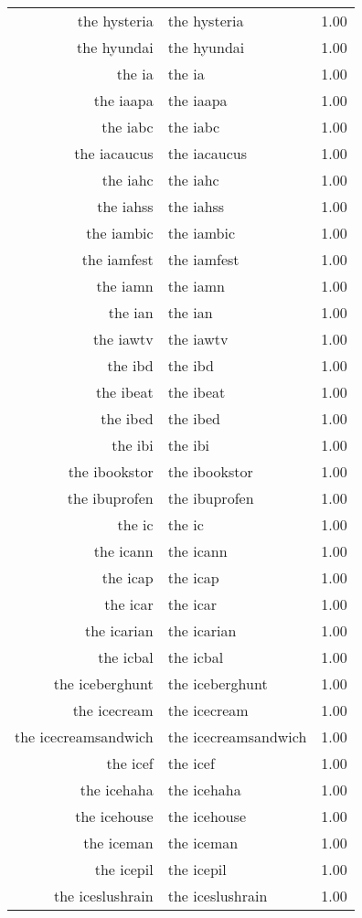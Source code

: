 \begin{table}[ht]
\begin{tabular}{rlr}
  the hysteria & the hysteria & 1.00 \\ 
  the hyundai & the hyundai & 1.00 \\ 
  the ia & the ia & 1.00 \\ 
  the iaapa & the iaapa & 1.00 \\ 
  the iabc & the iabc & 1.00 \\ 
  the iacaucus & the iacaucus & 1.00 \\ 
  the iahc & the iahc & 1.00 \\ 
  the iahss & the iahss & 1.00 \\ 
  the iambic & the iambic & 1.00 \\ 
  the iamfest & the iamfest & 1.00 \\ 
  the iamn & the iamn & 1.00 \\ 
  the ian & the ian & 1.00 \\ 
  the iawtv & the iawtv & 1.00 \\ 
  the ibd & the ibd & 1.00 \\ 
  the ibeat & the ibeat & 1.00 \\ 
  the ibed & the ibed & 1.00 \\ 
  the ibi & the ibi & 1.00 \\ 
  the ibookstor & the ibookstor & 1.00 \\ 
  the ibuprofen & the ibuprofen & 1.00 \\ 
  the ic & the ic & 1.00 \\ 
  the icann & the icann & 1.00 \\ 
  the icap & the icap & 1.00 \\ 
  the icar & the icar & 1.00 \\ 
  the icarian & the icarian & 1.00 \\ 
  the icbal & the icbal & 1.00 \\ 
  the iceberghunt & the iceberghunt & 1.00 \\ 
  the icecream & the icecream & 1.00 \\ 
  the icecreamsandwich & the icecreamsandwich & 1.00 \\ 
  the icef & the icef & 1.00 \\ 
  the icehaha & the icehaha & 1.00 \\ 
  the icehouse & the icehouse & 1.00 \\ 
  the iceman & the iceman & 1.00 \\ 
  the icepil & the icepil & 1.00 \\ 
  the iceslushrain & the iceslushrain & 1.00 \\ 

\end{tabular}
\end{table}
